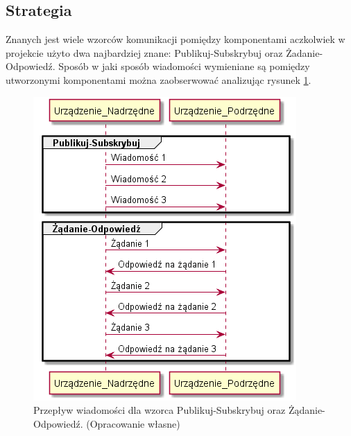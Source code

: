     \subsection{Strategia}
        Znanych jest wiele wzorców komunikacji pomiędzy komponentami aczkolwiek w projekcie użyto dwa najbardziej znane: Publikuj-Subskrybuj oraz Żadanie-Odpowiedź.
        Sposób w jaki sposób wiadomości wymieniane są pomiędzy utworzonymi komponentami można zaobserwować analizując rysunek \ref{fig:WzorceKomunikacji}.
        \begin{figure}[h!]
            \centering
            \includegraphics[scale=0.75]{out/Diagramy/PublishSubscribe_RequestResponse.png}
            \caption{Przepływ wiadomości dla wzorca Publikuj-Subskrybuj oraz Żądanie-Odpowiedź.
                \newline(Opracowanie własne)}
            \label{fig:WzorceKomunikacji}
        \end{figure}

